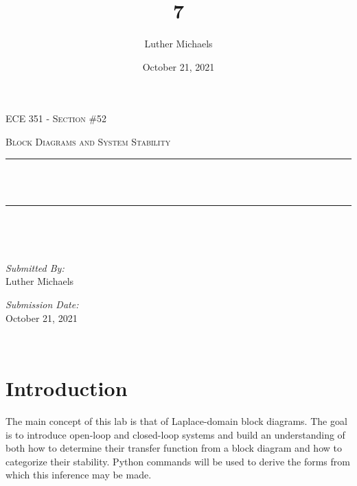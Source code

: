 \documentclass[12pt]{report}
\title{7}	%
\author{Luther Michaels}	%
\date{October 21, 2021}   %
\makeatletter
\let\thetitle\@title
\makeatother
\begin{document}
	
\begin{titlepage}
	\centering
	\vspace*{0.5 cm}
	
	\begin{center}    
		\textsc{\Large   ECE 351 - Section \#52}\\[2.0 cm]	
	\end{center}  
	\textsc{\Large Block Diagrams and System Stability }\\[0.5 cm]
	\rule{\linewidth}{0.2 mm} \\[0.4 cm]
	{ \huge \bfseries \thetitle}\\
	\rule{\linewidth}{0.2 mm} \\[1.5 cm]
	\begin{minipage}{0.4\textwidth}
		\begin{flushleft} \large
		\end{flushleft}
	\end{minipage}~
	\begin{minipage}{0.4\textwidth}
		\begin{flushright} \large
			\emph{Submitted By:} \\
			Luther Michaels \break
				
			\emph{Submission Date:} \\
			October 21, 2021
		\end{flushright}
	\end{minipage}\\[2 cm]
\end{titlepage}
	
	
\tableofcontents
\pagebreak
	
\renewcommand{\thesection}{\arabic{section}}
\section{Introduction}

The main concept of this lab is that of Laplace-domain block diagrams. The goal is to introduce open-loop and closed-loop systems and build an understanding of both how to determine their transfer function from a block diagram and how to categorize their stability. Python commands will be used to derive the forms from which this inference may be made. \\
\end{document}
